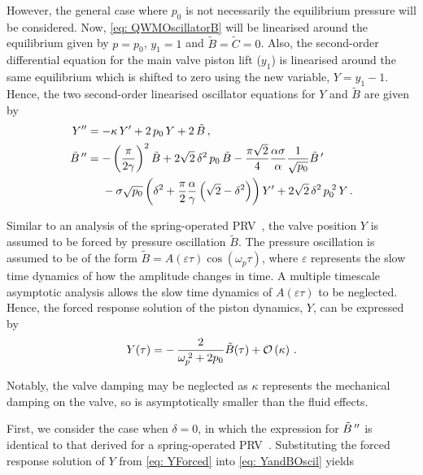 However, the general case where $p_0$ is not necessarily the equilibrium pressure will be considered. Now, \cref{eq: QWMOscillatorB} will be linearised around the equilibrium given by $p = p_0$, $y_1 = 1$ and $\tilde{B} = \tilde{C} = 0$. Also, the second-order differential equation for the main valve piston lift ($y_1$) is linearised around the same equilibrium which is shifted to zero using the new variable, $Y = y_1 - 1$. Hence, the two second-order linearised oscillator equations for $Y$ and $\tilde{B}$ are given by
~
\begin{equation} \label{eq: YandBOscil}
\begin{split}
    \ddash{Y} &= - \kappa \, \dash{Y} + 2 \, p_0 \, Y + 2 \, \tilde{B} \, , \\
    \ddash{\tilde{B}\,} &= - \left( \frac{\pi}{2 \gamma} \right)^2 \tilde{B} + 2 \sqrt{2} \, \delta^2 \, p_0 \, \tilde{B} - \frac{\pi \sqrt{2}}{4} \frac{\alpha \sigma}{\alpha} \frac{1}{\sqrt{p_0}} \dash{\tilde{B}\,}
    \\ & \quad \, \, %
    - \sigma \sqrt{p_0} \left( \delta^2 + \frac{\pi}{2} \frac{\alpha}{\gamma} \left( \sqrt{2} - \delta^2 \right) \right) \dash{Y} + 2 \sqrt{2} \, \delta^2 \, p_0\power{2} \, Y \, .
\end{split}
\end{equation}

Similar to an analysis of the spring-operated PRV~\cite{Hos2015ModelPipe}, the valve position $Y$ is assumed to be forced by pressure oscillation $\tilde{B}$. The pressure oscillation is assumed to be of the form $\tilde{B} = A(\varepsilon \tau) \cos\left( \omega_p \tau \right)$, where $\varepsilon$ represents the slow time dynamics of how the amplitude changes in time. A multiple timescale asymptotic analysis allows the slow time dynamics of $A(\varepsilon \tau)$ to be neglected. Hence, the forced response solution of the piston dynamics, $Y$, can be expressed by
~
\begin{equation} \label{eq: YForced}
    Y(\tau) = - \, \frac{2}{\omega_p^{\;2} + 2 p_0} \tilde{B}(\tau) + \mathcal{O}\left( \kappa \right) \, .
\end{equation}

Notably, the valve damping may be neglected as $\kappa$ represents the mechanical damping on the valve, so is asymptotically smaller than the fluid effects.

First, we consider the case when $\delta = 0$, in which the expression for $\tilde{B}\,{''}$ is identical to that derived for a spring-operated PRV~\cite{Hos2015DynamicModelling}. Substituting the forced response solution of $Y$ from \cref{eq: YForced} into \cref{eq: YandBOscil} yields


